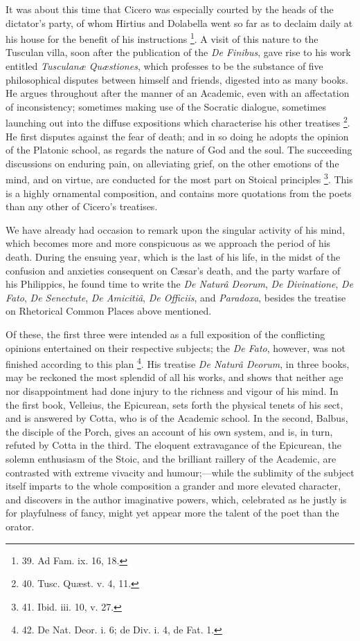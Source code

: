 It was about this time that
Cicero was especially courted by the heads of the dictator's party,
of whom Hirtius and Dolabella went so far as to declaim daily at his
house for the benefit of his instructions \footnote{39. Ad Fam. ix. 16, 18.}. A visit of
this nature to the Tusculan villa, soon after the publication of the \emph{De
Finibus}, gave rise to his work entitled \emph{Tusculanæ Quæstiones},
which professes to be the substance of five philosophical disputes
between himself and friends, digested into as many books. He argues
throughout after the manner of an Academic, even with an affectation
of inconsistency; sometimes making use of the Socratic dialogue,
sometimes launching out into the diffuse expositions which
characterise his other treatises \footnote{40. Tusc. Quæst. v. 4, 11.}. He first disputes against
the fear of death; and in so doing he adopts the opinion of the
Platonic school, as regards the nature of God and the soul. The
succeeding discussions on enduring pain, on alleviating grief, on the
other emotions of the mind, and on virtue, are conducted for the most
part on Stoical principles \footnote{41. Ibid. iii. 10, v. 27.}. This is a highly ornamental
composition, and contains more quotations from the poets than any
other of Cicero's treatises.

We have already had occasion
to remark upon the singular activity of his mind, which becomes more
and more conspicuous as we approach the period of his death. During
the ensuing year, which is the last of his life, in the midst of
the confusion and anxieties consequent on Cæsar's death, and the
party warfare of his Philippics, he found time to write the \emph{De
Naturâ Deorum}, \emph{De Divinatione}, \emph{De Fato}, \emph{De
Senectute}, \emph{De Amicitiâ}, \emph{De Officiis}, and \emph{Paradoxa},
besides the treatise on Rhetorical Common Places above mentioned.

Of these, the first three were
intended as a full exposition of the conflicting opinions entertained
on their respective subjects; the \emph{De Fato}, however, was not
finished according to this plan \footnote{42. De Nat. Deor. i. 6; de
Div. i. 4, de Fat. 1.}. His treatise \emph{De Naturâ
Deorum}, in three books, may be reckoned the most splendid of all
his works, and shows that neither age nor disappointment had done
injury to the richness and vigour of his mind. In the first book,
Velleius, the Epicurean, sets forth the physical tenets of his sect,
and is answered by Cotta, who is of the Academic school. In the
second, Balbus, the disciple of the Porch, gives an account of his own
system, and is, in turn, refuted by Cotta in the third. The eloquent
extravagance of the Epicurean, the solemn enthusiasm of the Stoic, and
the brilliant raillery of the Academic, are contrasted with extreme
vivacity and humour;—while the sublimity of the subject itself
imparts to the whole composition a grander and more elevated
character, and discovers in the author imaginative powers, which,
celebrated as he justly is for playfulness of fancy, might yet appear
more the talent of the poet than the orator.

